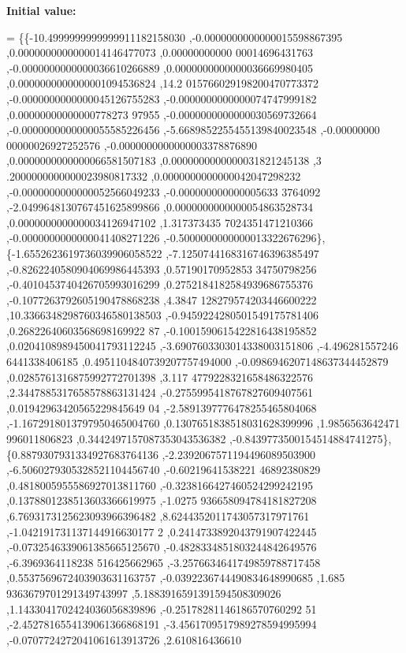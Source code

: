 {\bfseries Initial value\+:}
\begin{DoxyCode}
= \{\{-10.4999999999999911182158030 ,-0.0000000000000015598867395 ,0.0000000000000014146477073 ,0.00000000000
      00014696431763 ,-0.0000000000000036610266889 ,0.0000000000000036669980405 ,0.0000000000000001094536824 ,14.2
      015766029198200470773372 ,-0.0000000000000045126755283 ,-0.0000000000000074747999182 ,0.00000000000000778273
      97955 ,-0.0000000000000030569732664 ,-0.0000000000000055585226456 ,-5.6689852255455139840023548 ,-0.00000000
      00000026927252576 ,-0.0000000000000003378876890 ,0.0000000000000066581507183 ,0.0000000000000031821245138 ,3
      .2000000000000023980817332 ,0.0000000000000042047298232 ,-0.0000000000000052566049233 ,-0.000000000000005633
      3764092 ,-2.0499648130767451625899866 ,0.0000000000000054863528734 ,0.0000000000000034126947102 ,1.317373435
      7024351471210366 ,-0.0000000000000041408271226 ,-0.5000000000000013322676296\},
\{-1.6552623619736039906058522 ,-7.1250744168316746396385497 ,-0.8262240580904069986445393 ,0.57190170952853
      34750798256 ,-0.4010453740426705993016299 ,0.2752184182584939686755376 ,-0.1077263792605190478868238 ,4.3847
      128279574203446600222 ,10.3366348298760346580138503 ,-0.9459224280501549175781406 ,0.26822640603568698169922
      87 ,-0.1001590615422816438195852 ,0.0204108989450041793112245 ,-3.6907603303014338003151806 ,-4.496281557246
      6441338406185 ,0.4951104840739207757494000 ,-0.0986946207148637344452879 ,0.0285761316875992772701398 ,3.117
      4779228321658486322576 ,2.3447885317658578863131424 ,-0.2755995418767827609407561 ,0.01942963420565229845649
      04 ,-2.5891397776478255465804068 ,-1.1672918013797950465004760 ,0.1307651838518031628399996 ,1.9856563642471
      996011806823 ,0.3442497157087353043536382 ,-0.8439773500154514884741275\},
\{0.8879307931334927683764136 ,-2.2392067571194496089503900 ,-6.5060279305328521104456740 ,-0.60219641538221
      46892380829 ,0.4818005955586927013811760 ,-0.3238166427460524299242195 ,0.1378801238513603366619975 ,-1.0275
      936658094784181827208 ,6.7693173125623093966396482 ,8.6244352011743057317971761 ,-1.042191731137144916630177
      2 ,0.2414733892043791907422445 ,-0.0732546339061385665125670 ,-0.4828334851803244842649576 ,-6.3969364118238
      516425662965 ,-3.2576634641749859788717458 ,0.5537569672403903631163757 ,-0.0392236744490834648990685 ,1.685
      9363679701291349743997 ,5.1883916591391594508309026 ,1.1433041702424036056839896 ,-0.25178281146186570760292
      51 ,-2.4527816554139061366868191 ,-3.4561709517989278594995994 ,-0.0707724272041061613913726 ,2.610816436610

\end{DoxyCode}
